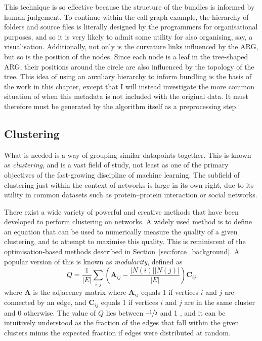 This technique is so effective because the structure of the bundles is informed by human judgement. To continue within the call graph example, the hierarchy of folders and source files is literally designed by the programmers for organisational purposes, and so it is very likely to admit some utility for also organising, say, a visualisation.
Additionally, not only is the curvature links influenced by the ARG, but so is the position of the nodes. Since each node is a leaf in the tree-shaped ARG, their positions around the circle are also influenced by the topology of the tree.
This idea of using an auxiliary hierarchy to inform bundling is the basis of the work in this chapter, except that I will instead investigate the more common situation of when this metadata is not included with the original data. It must therefore must be generated by the algorithm itself as a preprocessing step.

\subsection{Clustering}
What is needed is a way of grouping similar datapoints together. This is known as \textit{clustering}, and is a vast field of study, not least as one of the primary objectives of the fast-growing discipline of machine learning. The subfield of clustering just within the context of networks is large in its own right, due to its utility in common datasets such as protein--protein interaction or social networks.

There exist a wide variety of powerful and creative methods that have been developed to perform clustering on networks. A widely used method is to define an equation that can be used to numerically measure the quality of a given clustering, and to attempt to maximise this quality. This is reminiscent of the optimisation-based methods described in Section~\ref{sec:force_background}.
A popular version of this is known as \emph{modularity}, defined as
\begin{equation}
    Q = \frac{1}{|E|}\sum_{i,j}\left(\mathbf{A}_{ij} - \frac{|N(i)||N(j)|}{|E|}\right)\mathbf{C}_{ij}
    \label{eq:modularity}
\end{equation}
where $\mathbf{A}$ is the adjacency matrix where $\mathbf{A}_{ij}$ equals 1 if vertices $i$ and $j$ are connected by an edge, and $\mathbf{C}_{ij}$ equals 1 if vertices $i$ and $j$ are in the same cluster and 0 otherwise.
The value of $Q$ lies between $\text{--}\sfrac{1}{2}$ and 1 \cite{Brandes2007a}, and it can be intuitively understood as the fraction of the edges that fall within the given clusters minus the expected fraction if edges were distributed at random.

